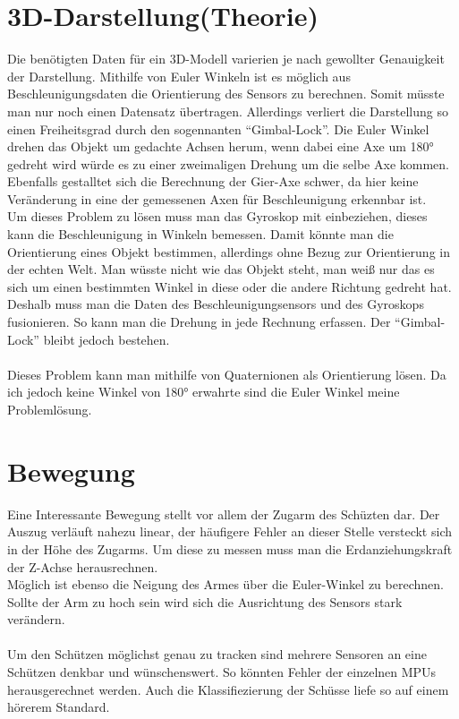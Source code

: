\section{3D-Darstellung(Theorie)}
Die benötigten Daten für ein 3D-Modell varierien je nach gewollter Genauigkeit der Darstellung.
Mithilfe von Euler Winkeln ist es möglich aus Beschleunigungsdaten die Orientierung des Sensors zu berechnen.
Somit müsste man nur noch einen Datensatz übertragen. Allerdings verliert die Darstellung so einen
Freiheitsgrad durch den sogennanten ``Gimbal-Lock''. Die Euler Winkel drehen das Objekt um gedachte
Achsen herum, wenn dabei eine Axe um 180° gedreht wird würde es zu einer zweimaligen Drehung
um die selbe Axe kommen. Ebenfalls gestalltet sich die Berechnung der Gier-Axe schwer, da hier
keine Veränderung in eine der gemessenen Axen für Beschleunigung erkennbar ist.
\\
Um dieses Problem zu lösen muss man das Gyroskop mit einbeziehen, dieses kann die Beschleunigung
in Winkeln bemessen. Damit könnte man die Orientierung eines Objekt bestimmen, allerdings ohne 
Bezug zur Orientierung in der echten Welt. Man wüsste nicht wie das Objekt steht, man weiß nur 
das es sich um einen bestimmten Winkel in diese oder die andere Richtung gedreht hat. \\
Deshalb muss man die Daten des Beschleunigungsensors und des Gyroskops fusionieren. So kann man 
die Drehung in jede Rechnung erfassen. Der ``Gimbal-Lock'' bleibt jedoch bestehen.\\
\\
Dieses Problem kann man mithilfe von Quaternionen als Orientierung lösen. Da ich jedoch keine 
Winkel von 180° erwahrte sind die Euler Winkel meine Problemlösung.

\section {Bewegung}
Eine Interessante Bewegung stellt vor allem der Zugarm des 
Schüzten dar. Der Auszug verläuft nahezu linear, der häufigere Fehler 
an dieser Stelle versteckt sich in der Höhe des Zugarms. 
Um diese zu messen muss man die Erdanziehungskraft der Z-Achse herausrechnen.\\
Möglich ist ebenso die Neigung des Armes über die Euler-Winkel zu berechnen. Sollte 
der Arm zu hoch sein wird sich die Ausrichtung des Sensors stark verändern.\\
\\
Um den Schützen möglichst genau zu tracken sind mehrere Sensoren an eine Schützen denkbar und
wünschenswert. So könnten Fehler der einzelnen MPUs herausgerechnet werden.
Auch die Klassifiezierung der Schüsse liefe so auf einem hörerem Standard.
\\




